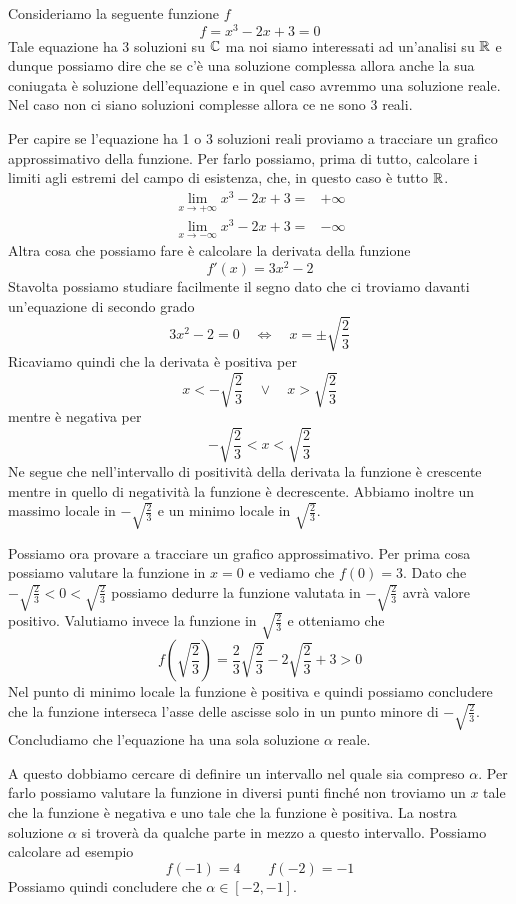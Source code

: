 \begin{example}
	Consideriamo la seguente funzione $f$
	\[ f = x^3 - 2x + 3 = 0 \]
	Tale equazione ha 3 soluzioni su $\mathbb{C}$ ma noi siamo interessati ad un'analisi su $\mathbb{R}$ e dunque possiamo dire
	che se c'è una soluzione complessa allora anche la sua coniugata è soluzione dell'equazione e in quel caso
	avremmo una soluzione reale. Nel caso non ci siano soluzioni complesse allora ce ne sono 3 reali.

	Per capire se l'equazione ha 1 o 3 soluzioni reali proviamo a tracciare un grafico approssimativo della
	funzione. Per farlo possiamo, prima di tutto, calcolare i limiti agli estremi del campo di esistenza, che,
	in questo caso è tutto $\mathbb{R}$.
	\begin{align*}
		\lim_{x \to +\infty} x^3 - 2x + 3 = & +\infty \\
		\lim_{x \to -\infty} x^3 - 2x + 3 = & -\infty
	\end{align*}
	Altra cosa che possiamo fare è calcolare la derivata della funzione
	\[ f'(x) = 3x^2 - 2 \]
	Stavolta possiamo studiare facilmente il segno dato che ci troviamo davanti un'equazione di secondo grado
	\[ 3x^2 - 2 = 0 \quad \Leftrightarrow \quad x = \pm \sqrt{\frac{2}{3}} \]
	Ricaviamo quindi che la derivata è positiva per
	\[ x < -\sqrt{\frac{2}{3}} \quad \vee \quad x > \sqrt{\frac{2}{3}} \]
	mentre è negativa per
	\[ -\sqrt{\frac{2}{3}} < x < \sqrt{\frac{2}{3}} \]
	Ne segue che nell'intervallo di positività della derivata la funzione è crescente mentre in quello di
	negatività la funzione è decrescente. Abbiamo inoltre un massimo locale in $-\sqrt{\frac{2}{3}}$ e un
	minimo locale in $\sqrt{\frac{2}{3}}$.

	Possiamo ora provare a tracciare un grafico approssimativo. Per prima cosa possiamo valutare la funzione in
	$x = 0$ e vediamo che $f(0) = 3$. Dato che $-\sqrt{\frac{2}{3}} < 0 < \sqrt{\frac{2}{3}}$ possiamo dedurre
	la funzione valutata in $-\sqrt{\frac{2}{3}}$ avrà valore positivo. Valutiamo invece la funzione in
	$\sqrt{\frac{2}{3}}$ e otteniamo che
	\[ f \left( \sqrt{\frac{2}{3}} \right) = \frac{2}{3} \sqrt{\frac{2}{3}} - 2 \sqrt{\frac{2}{3}} + 3 > 0 \]
	Nel punto di minimo locale la funzione è positiva e quindi possiamo concludere che la funzione interseca
	l'asse delle ascisse solo in un punto minore di $-\sqrt{\frac{2}{3}}$. Concludiamo che l'equazione ha una
	sola soluzione $\alpha$ reale.

	A questo dobbiamo cercare di definire un intervallo nel quale sia compreso $\alpha$. Per farlo possiamo
	valutare la funzione in diversi punti finché non troviamo un $x$ tale che la funzione è negativa e uno
	tale che la funzione è positiva. La nostra soluzione $\alpha$ si troverà da qualche parte in mezzo a questo
	intervallo. Possiamo calcolare ad esempio
	\[ f(-1) = 4 \quad \quad f(-2) = -1 \]
	Possiamo quindi concludere che $\alpha \in [-2, -1]$.
\end{example}

